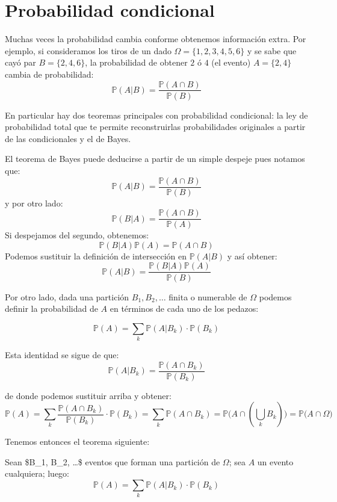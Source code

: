 \documentclass[
]{book}
\begin{document}
\hypertarget{probabilidad-condicional}{%
\section{Probabilidad condicional}\label{probabilidad-condicional}}

Muchas veces la probabilidad cambia conforme obtenemos información extra. Por ejemplo, si consideramos los tiros de un dado \(\Omega = \{1,2,3,4,5,6\}\) y se sabe que cayó par \(B = \{2,4,6 \}\), la probabilidad de obtener \(2\) ó \(4\) (el evento) \(A = \{ 2, 4\}\) cambia de probabilidad:
\[
\mathbb{P}(A | B) = \dfrac{\mathbb{P}(A \cap B)}{\mathbb{P}(B)}
\]

En particular hay dos teoremas principales con probabilidad condicional: la ley de probabilidad total que te permite reconstruirlas probabilidades originales a partir de las condicionales y el de Bayes.

El teorema de Bayes puede deducirse a partir de un simple despeje pues notamos que:
\[
\mathbb{P}(A | B) = \dfrac{\mathbb{P}(A \cap B)}{\mathbb{P}(B)}
\]
y por otro lado:
\[
\mathbb{P}(B | A) = \dfrac{\mathbb{P}(A \cap B)}{\mathbb{P}(A)}
\]
Si despejamos del segundo, obtenemos:
\[
\mathbb{P}(B | A)\mathbb{P}(A) = \mathbb{P}(A \cap B)
\]
Podemos sustituir la definición de intersección en \(\mathbb{P}(A|B)\) y así obtener:
\[
\mathbb{P}(A | B) = \dfrac{\mathbb{P}(B | A)\mathbb{P}(A)}{\mathbb{P}(B)}
\]

Por otro lado, dada una partición \(B_1, B_2, \dots\) finita o numerable de \(\Omega\) podemos definir la probabilidad de \(A\) en términos de cada uno de los pedazos:

\[
\mathbb{P}(A) = \sum\limits_{k} \mathbb{P}(A | B_k) \cdot \mathbb{P}(B_k)
\]

Esta identidad se sigue de que:
\[
\mathbb{P}(A | B_k) = \dfrac{\mathbb{P}(A \cap B_k)}{\mathbb{P}(B_k)}
\]

de donde podemos sustituir arriba y obtener:
\[
\mathbb{P}(A) = \sum\limits_{k} \dfrac{\mathbb{P}(A \cap B_k)}{\mathbb{P}(B_k)} \cdot \mathbb{P}(B_k) = \sum\limits_{k} \mathbb{P}(A \cap B_k) =  \mathbb{P}\big(A \cap (\bigcup_k B_k) \big) =  \mathbb{P}\big(A \cap \Omega \big) 
\]

Tenemos entonces el teorema siguiente:

Sean \$B\_1, B\_2, \dots \$ eventos que forman una partición de \(\Omega\); sea \(A\) un evento cualquiera; luego:
\[
\mathbb{P}(A) = \sum\limits_{k} \mathbb{P}(A | B_k) \cdot \mathbb{P}(B_k)
\]
\end{document}
